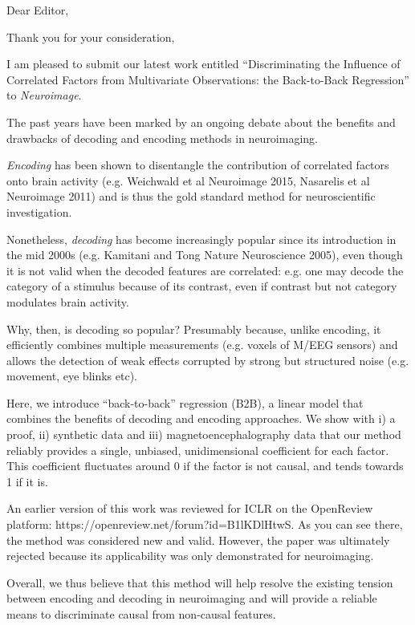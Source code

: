\documentclass[11pt,a4paper,roman]{moderncv}        %
\begin{document}
\date{\today}
\opening{Dear Editor,}
\closing{Thank you for your consideration,}
\makelettertitle

I am pleased to submit our latest work entitled “Discriminating the Influence of
Correlated Factors from Multivariate Observations: the Back-to-Back Regression”
to \emph{Neuroimage}.

The past years have been marked by an ongoing debate about the benefits and
drawbacks of decoding and encoding methods in neuroimaging.

\emph{Encoding} has been shown to disentangle the contribution of correlated factors
onto brain activity (e.g. Weichwald et al Neuroimage 2015, Nasarelis et al Neuroimage 2011)
and is thus the gold standard method for neuroscientific investigation.

Nonetheless, \emph{decoding} has become increasingly popular since its introduction in
the mid 2000s (e.g. Kamitani and Tong Nature Neuroscience 2005), even though it
is not valid when the decoded features are correlated: e.g. one may decode the
category of a stimulus because of its contrast, even if contrast but not
category modulates brain activity.

Why, then, is decoding so popular? Presumably because, unlike encoding, it
efficiently combines multiple measurements (e.g. voxels of M/EEG sensors) and
allows the detection of weak effects corrupted by strong but structured noise (e.g. movement,
eye blinks etc).

Here, we introduce “back-to-back” regression (B2B), a linear model that combines the
benefits of decoding and encoding approaches. We show with i) a proof, ii)
synthetic data and iii) magnetoencephalography data that our method reliably provides a single,
unbiased, unidimensional coefficient for each factor. This coefficient fluctuates
around 0 if the factor is not causal, and tends towards 1 if it is.

An earlier version of this work was reviewed for ICLR on the
OpenReview platform: https://openreview.net/forum?id=B1lKDlHtwS. As you can see
there, the method was considered new and valid. However, the paper was
ultimately rejected because its applicability was only demonstrated for
neuroimaging.

Overall, we thus believe that this method will help resolve the existing tension
between encoding and decoding in neuroimaging and will provide a reliable means
to discriminate causal from non-causal features.


\vspace{0.5cm}


\makeletterclosing
\end{document}

